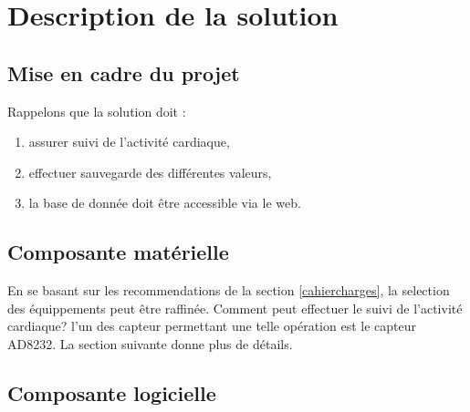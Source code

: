 \chapter{Description de la solution}
\section{Mise en cadre du projet\label{cahiercharges}}
Rappelons que la solution doit :
\begin{enumerate}
  \item assurer suivi de l'activité cardiaque,
  \item effectuer sauvegarde des différentes valeurs,
  \item la base de donnée doit être accessible via le web.
\end{enumerate}
\section{Composante matérielle}
En se basant sur les recommendations de la section \ref{cahiercharges}, la selection des équippements peut être raffinée. Comment peut effectuer le suivi de l'activité cardiaque? l'un des capteur permettant une telle opération est le capteur AD8232. La section suivante donne plus de détails.



\section{Composante logicielle}